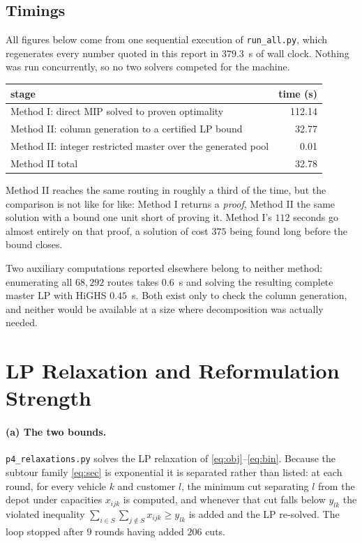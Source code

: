 \documentclass[11pt]{article}
\begin{document}
\subsection{Timings}

All figures below come from one sequential execution of
\texttt{run\_all.py}, which regenerates every number quoted in this
report in $379.3$~s of wall clock. Nothing was run concurrently, so no
two solvers competed for the machine.

\begin{center}
\begin{tabular}{@{}lr@{}}
\toprule
stage & time (s)\\
\midrule
Method I: direct MIP solved to proven optimality & 112.14\\
Method II: column generation to a certified LP bound & 32.77\\
Method II: integer restricted master over the generated pool & 0.01\\
\midrule
Method II total & 32.78\\
\bottomrule
\end{tabular}
\end{center}

Method II reaches the same routing in roughly a third of the time, but
the comparison is not like for like: Method I returns a \emph{proof},
Method II the same solution with a bound one unit short of proving it.
Method I's $112$ seconds go almost entirely on that proof, a solution
of cost $375$ being found long before the bound closes.

Two auxiliary computations reported elsewhere belong to neither
method: enumerating all $68{,}292$ routes takes $0.6$~s and solving
the resulting complete master LP with HiGHS $0.45$~s. Both exist only
to check the column generation, and neither would be available at a
size where decomposition was actually needed.

\section{LP Relaxation and Reformulation Strength}

\paragraph{(a) The two bounds.}
\texttt{p4\_relaxations.py} solves the LP relaxation of
\eqref{eq:obj}--\eqref{eq:bin}. Because the subtour family
\eqref{eq:sec} is exponential it is separated rather than listed: at
each round, for every vehicle $k$ and customer $l$, the minimum cut
separating $l$ from the depot under capacities $x_{ijk}$ is computed,
and whenever that cut falls below $y_{lk}$ the violated inequality
$\sum_{i \in S}\sum_{j \notin S} x_{ijk} \ge y_{lk}$ is added and the
LP re-solved. The loop stopped after $9$ rounds having added $206$
cuts.
\end{document}
